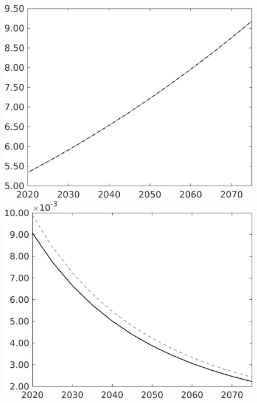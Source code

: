 \documentclass[12pt]{article}
\begin{document}
\begin{figure}[h!!]
\begin{minipage}[]{0.32\textwidth}
	\end{minipage}	
	\begin{minipage}[]{0.32\textwidth}
		\includegraphics[width=1\textwidth]{../../codding_model/own_basedOnFried/optimalPol_010922_revision/figures/all_13Sept22/CompTaul_Equlab_LFBAU_Reg0_pgpftf_spillover0_nsk1_xgr0_knspil1_sep1_countec0_GovRev0_etaa0.79_lgd0.png}
	\end{minipage}		
	\begin{minipage}[]{0.32\textwidth}
		\includegraphics[width=1\textwidth]{../../codding_model/own_basedOnFried/optimalPol_010922_revision/figures/all_13Sept22/CompTaul_Equlab_LFBAU_Reg0_Lf_spillover0_nsk1_xgr0_knspil1_sep1_countec0_GovRev0_etaa0.79_lgd0.png}

\end{minipage}
\end{figure}
\end{document}
